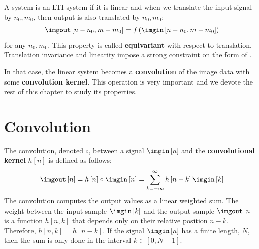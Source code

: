 %
A system is an LTI system if it is linear and when we translate the input signal by $n_0, m_0$, then output is also translated by $n_0, m_0$:
\begin{equation}
    \imgout \left[ n - n_0, m-m_0 \right] = f \left( \imgin \left[ n-n_0, m-m_0 \right] \right)
\end{equation}
for any $n_0,m_0$. This property is called {\bf equivariant}
with respect to translation. Translation invariance and linearity impose a strong constraint on the form of \eqn{\ref{eq:general_lin_filter}}.

 
 In that case, the linear system becomes a {\bf convolution} of the image data with some {\bf convolution kernel}. This operation is very important and we devote the rest of this chapter to study its properties.


 \section{Convolution}

 The convolution, denoted $\circ$, between a signal $\imgin \left[n \right]$ and the {\bf convolutional kernel} $h\left[n \right]$ is defined as follows:
\begin{equation}
\imgout \left[n\right] = h \left[n\right] \circ \imgin \left[n\right] =  \sum_{k=-\infty}^{\infty} h \left[n-k \right] \imgin \left[k \right]
\label{eq:1dconv}
\end{equation}
The convolution computes the output values as a linear weighted sum. The weight between the input sample $\imgin \left[k \right]$ and the output sample $\imgout \left[n\right]$ is a function $h\left[n, k \right]$ that depends only on their relative position $n-k$. Therefore, $h\left[n, k \right]=h\left[n-k \right]$. If the signal $\imgin \left[n \right]$ has a finite length, $N$, then the sum is only done in the interval $k \in \left[0,N-1\right]$.

